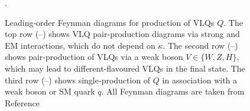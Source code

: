 \begin{figure}[t]
  \caption{Leading-order Feynman diagrams for production of VLQs $Q$.  The top row (\protect{}--\protect{}) shows VLQ pair-production diagrams via strong and EM interactions, which do not depend on $\kappa$.  The second row (\protect{}--\protect{}) shows pair-production of VLQs via a weak boson $V \in \{W,Z,H\}$, which may lead to different-flavoured VLQs in the final state. The third row (\protect{}--\protect{}) shows single-production of $Q$ in association with a weak boson or SM quark $q$. All Feynman diagrams are taken from Reference~\cite{VLQ_contur}}.
\label{fig:feyndiags}
\end{figure}

